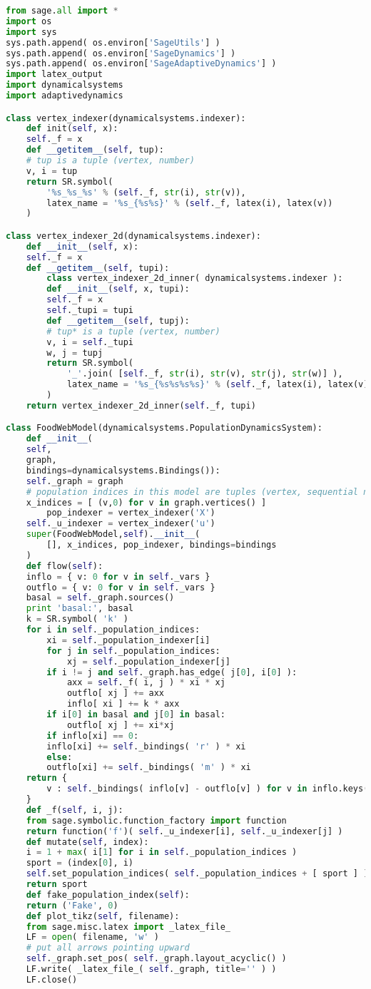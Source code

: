 \begin{lstlisting}[language=Python]
from sage.all import * 
import os
import sys
sys.path.append( os.environ['SageUtils'] )
sys.path.append( os.environ['SageDynamics'] )
sys.path.append( os.environ['SageAdaptiveDynamics'] )
import latex_output
import dynamicalsystems
import adaptivedynamics

class vertex_indexer(dynamicalsystems.indexer):
    def init(self, x):
	self._f = x
    def __getitem__(self, tup):
	# tup is a tuple (vertex, number)
	v, i = tup
	return SR.symbol(
	    '%s_%s_%s' % (self._f, str(i), str(v)),
	    latex_name = '%s_{%s%s}' % (self._f, latex(i), latex(v))
	)

class vertex_indexer_2d(dynamicalsystems.indexer):
    def __init__(self, x):
	self._f = x
    def __getitem__(self, tupi):
        class vertex_indexer_2d_inner( dynamicalsystems.indexer ):
	    def __init__(self, x, tupi):
		self._f = x
		self._tupi = tupi
	    def __getitem__(self, tupj):
		# tup* is a tuple (vertex, number)
		v, i = self._tupi
		w, j = tupj
		return SR.symbol(
		    '_'.join( [self._f, str(i), str(v), str(j), str(w)] ),
		    latex_name = '%s_{%s%s%s%s}' % (self._f, latex(i), latex(v), latex(j), latex(w))
		)
	return vertex_indexer_2d_inner(self._f, tupi)

class FoodWebModel(dynamicalsystems.PopulationDynamicsSystem):
    def __init__(
	self,
	graph,
	bindings=dynamicalsystems.Bindings()):
	self._graph = graph
	# population indices in this model are tuples (vertex, sequential number)
	x_indices = [ (v,0) for v in graph.vertices() ]
        pop_indexer = vertex_indexer('X')
	self._u_indexer = vertex_indexer('u')
	super(FoodWebModel,self).__init__(
	    [], x_indices, pop_indexer, bindings=bindings
	)
    def flow(self):
	inflo = { v: 0 for v in self._vars }
	outflo = { v: 0 for v in self._vars }
	basal = self._graph.sources()
	print 'basal:', basal
	k = SR.symbol( 'k' )
	for i in self._population_indices:
	    xi = self._population_indexer[i]
	    for j in self._population_indices:
	        xj = self._population_indexer[j]
		if i != j and self._graph.has_edge( j[0], i[0] ):
		    axx = self._f( i, j ) * xi * xj
		    outflo[ xj ] += axx
		    inflo[ xi ] += k * axx
		if i[0] in basal and j[0] in basal:
		    outflo[ xj ] += xi*xj
	    if inflo[xi] == 0:
		inflo[xi] += self._bindings( 'r' ) * xi
	    else:
		outflo[xi] += self._bindings( 'm' ) * xi
	return {
	    v : self._bindings( inflo[v] - outflo[v] ) for v in inflo.keys()
	}
    def _f(self, i, j):
	from sage.symbolic.function_factory import function
	return function('f')( self._u_indexer[i], self._u_indexer[j] )
    def mutate(self, index):
	i = 1 + max( i[1] for i in self._population_indices )
	sport = (index[0], i)
	self.set_population_indices( self._population_indices + [ sport ] )
	return sport
    def fake_population_index(self):
	return ('Fake', 0)
    def plot_tikz(self, filename):
	from sage.misc.latex import _latex_file_
	LF = open( filename, 'w' )
	# put all arrows pointing upward
	self._graph.set_pos( self._graph.layout_acyclic() )
	LF.write( _latex_file_( self._graph, title='' ) )
	LF.close()
\end{lstlisting}
